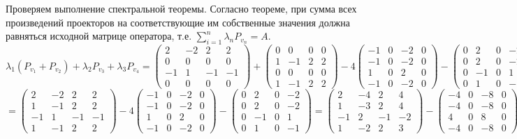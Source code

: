 \documentclass{article}
\newcommand{\la}{\lambda}
\begin{document}
\noindent Проверяем выполнение спектральной теоремы. Согласно теореме, при сумма всех произведений проекторов на соответствующие им собственные значения должна равняться исходной матрице оператора, т.е. $\sum\limits_{i=1}^n\la_n P_{v_n} = A$.
$$\la_1 (P_{v_1} + P_{v_2}) + \la_2 P_{v_3} + \la_3 P_{v_4} = \begin{pmatrix}
2 & -2 & 2 & 2 \\
0 & 0 & 0 & 0 \\
-1 & 1 & -1 & -1 \\
0 & 0 & 0 & 0 
\end{pmatrix} + \begin{pmatrix}
0 & 0 & 0 & 0 \\
1 & -1 & 2 & 2 \\
0 & 0 & 0 & 0 \\
1 & -1 & 2 & 2 
\end{pmatrix} -4\begin{pmatrix}
-1 & 0 & -2 & 0 \\
-1 & 0 & -2 & 0 \\
1 & 0 & 2 & 0 \\
-1 & 0 & -2 & 0
\end{pmatrix} -\begin{pmatrix}
0 & 2 & 0 & -2 \\
0 & 2 & 0 & -2 \\
0 & -1 & 0 & 1 \\
0 & 1 & 0 & -1
\end{pmatrix} =$$
$$= \begin{pmatrix}
2 & -2 & 2 & 2 \\
1 & -1 & 2 & 2 \\
-1 & 1 & -1 & -1 \\
1 & -1 & 2 & 2
\end{pmatrix} -4\begin{pmatrix}
-1 & 0 & -2 & 0 \\
-1 & 0 & -2 & 0 \\
1 & 0 & 2 & 0 \\
-1 & 0 & -2 & 0
\end{pmatrix} -\begin{pmatrix}
0 & 2 & 0 & -2 \\
0 & 2 & 0 & -2 \\
0 & -1 & 0 & 1 \\
0 & 1 & 0 & -1
\end{pmatrix} = \begin{pmatrix}
2 & -4 & 2 & 4 \\
1 & -3 & 2 & 4 \\
-1 & 2 & -1 & -2 \\
1 & -2 & 2 & 3
\end{pmatrix} -\begin{pmatrix}
-4 & 0 & -8 & 0 \\
-4 & 0 & -8 & 0 \\
4 & 0 & 8 & 0 \\
-4 & 0 & -8 & 0
\end{pmatrix} =$$ 
\end{document}
